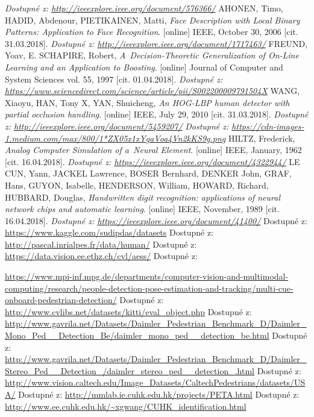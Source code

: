 \begin{thebibliography}{99}
 		\textit{Dostupné z: \url{http://ieeexplore.ieee.org/document/576366/}}
	 AHONEN, Timo, HADID, Abdenour, PIETIKAINEN, Matti, \textit{Face Description with Local Binary Patterns: Application to Face Recognition}. [online] IEEE, October 30, 2006 [cit. 31.03.2018]. 
 		\textit{Dostupné z: \url{http://ieeexplore.ieee.org/document/1717463/}}
 	 FREUND, Yoav, E. SCHAPIRE, Robert, \textit{A~Decision-Theoretic Generalization of On-Line Learning and an Application to Boosting}. [online] Journal of Computer and System Sciences vol. 55, 1997 [cit. 01.04.2018]. 
 		\textit{Dostupné z: \url{https://www.sciencedirect.com/science/article/pii/S002200009791504X}}
 	 WANG, Xiaoyu, HAN, Tony X, YAN, Shuicheng, \textit{An HOG-LBP human detector with partial occlusion handling}. [online] IEEE, July 29, 2010 [cit. 31.03.2018]. 
 	\textit{Dostupné z: \url{http://ieeexplore.ieee.org/document/5459207/}}
	 \textit{Dostupné z: \url{https://cdn-images-1.medium.com/max/800/1*ZX05x1xYgaVoa4Vn2kKS9g.png}}
	 HILTZ, Frederick, \textit{Analog Computer Simulation of a~Neural Element}. [online] IEEE, January, 1962 [cit. 16.04.2018]. 
 	\textit{Dostupné z: \url{https://ieeexplore.ieee.org/document/4322944/}}
 	 LE CUN, Yann, JACKEL Lawrence, BOSER Bernhard, DENKER John, GRAF, Hans, GUYON, Isabelle, HENDERSON, William, HOWARD, Richard, HUBBARD, Douglas, \textit{Handwritten digit recognition: applications of neural network chips and automatic learning}. [online] IEEE, November, 1989 [cit. 16.04.2018]. 
 	\textit{Dostupné z: \url{https://ieeexplore.ieee.org/document/41400/}}
 	 Dostupné z: \url{https://www.kaggle.com/sudipdas/datasets}
 	 Dostupné z: \url{http://pascal.inrialpes.fr/data/human/}
 	 Dostupné z: \url{https://data.vision.ee.ethz.ch/cvl/aess/}
 	 Dostupné z:  

		\url{https://www.mpi-inf.mpg.de/departments/computer-vision-and-multimodal-computing/research/people-detection-pose-estimation-and-tracking/multi-cue-onboard-pedestrian-detection/}
 	 Dostupné z: \url{http://www.cvlibs.net/datasets/kitti/eval_object.php}
 	 Dostupné z: \url{http://www.gavrila.net/Datasets/Daimler_Pedestrian_Benchmark_D/Daimler_Mono_Ped__Detection_Be/daimler_mono_ped__detection_be.html}
 	 Dostupné z: \url{http://www.gavrila.net/Datasets/Daimler_Pedestrian_Benchmark_D/Daimler_Stereo_Ped__Detection_/daimler_stereo_ped__detection_.html}
 	 Dostupné z: \url{http://www.vision.caltech.edu/Image_Datasets/CaltechPedestrians/datasets/USA/}
 	 Dostupné z: \url{http://mmlab.ie.cuhk.edu.hk/projects/PETA.html}
 	 Dostupné z: \url{http://www.ee.cuhk.edu.hk/~xgwang/CUHK_identification.html}
\end{thebibliography}
